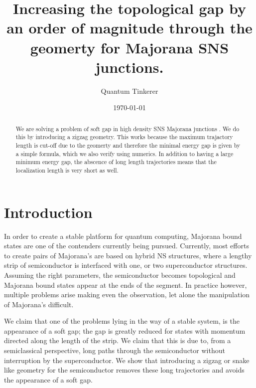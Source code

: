 \documentclass[english, twocolumn, 10pt, aps, superscriptaddress, floatfix, prb, citeautoscript]{revtex4-1}
\begin{document}
\title{Increasing the topological gap by an order of magnitude through the geomerty for Majorana SNS junctions.}

\author{Quantum Tinkerer}

\date{\today}

\begin{abstract}
We are solving a problem of soft gap in high density SNS Majorana junctions \cite{pientka2017topological}.
We do this by introducing a zigzag geometry.
This works because the maximum trajactory length is cut-off due to the geomerty and therefore the minimal energy gap is given by a simple formula, which we also verify using numerics.
In addition to having a large minimum energy gap, the abscence of long length trajectories means that the localization length is very short as well.
\end{abstract}

\maketitle


\section{Introduction}
In order to create a stable platform for quantum computing, Majorana bound states are one of the contenders currently being pursued. Currently, most efforts to create pairs of Majorana's are based on hybrid NS structures, where a lengthy strip of semiconductor is interfaced with one, or two superconductor structures. Assuming the right parameters, the semiconductor becomes topological and Majorana bound states appear at the ends of the segment. In practice however, multiple problems arise making even the observation, let alone the manipulation of Majorana's difficult.

We claim that one of the problems lying in the way of a stable system, is the appearance of a soft gap; the gap is greatly reduced for states with momentum directed along the length of the strip. We claim that this is due to, from a semiclassical perspective, long paths through the semiconductor without interruption by the superconductor. We show that introducing a zigzag or snake like geometry for the semiconductor removes these long trajectories and avoids the appearance of a soft gap.
\end{document}
